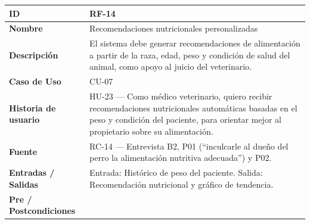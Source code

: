 \documentclass[
]{article}
\newcounter{none} %
\begin{document}
{\def\LTcaptype{none} %
\begin{longtable}[]{|
  >{\raggedright\arraybackslash}p{}|
  >{\raggedright\arraybackslash}p{}|}
\hline
\begin{minipage}[b]{\linewidth}\raggedright
\textbf{ID}
\end{minipage} & \begin{minipage}[b]{\linewidth}\raggedright
RF-14
\end{minipage} \\
\hline
\endhead
\hline
\endlastfoot
\textbf{Nombre} & \begin{minipage}[t]{\linewidth}\raggedright
Recomendaciones nutricionales personalizadas
\end{minipage} \\
\hline
\textbf{Descripción} & \begin{minipage}[t]{\linewidth}\raggedright
El sistema debe generar recomendaciones de alimentación a partir de la raza, edad, peso y condición de salud del animal, como apoyo al juicio del veterinario.
\end{minipage} \\
\hline
\textbf{Caso de Uso} & \begin{minipage}[t]{\linewidth}\raggedright
CU-07
\end{minipage} \\
\hline
\textbf{Historia de usuario} & \begin{minipage}[t]{\linewidth}\raggedright
HU-23 — Como médico veterinario, quiero recibir recomendaciones nutricionales automáticas basadas en el peso y condición del paciente, para orientar mejor al propietario sobre su alimentación.
\end{minipage} \\
\hline
\textbf{Fuente} & \begin{minipage}[t]{\linewidth}\raggedright
RC-14 — Entrevista B2, P01 (“inculcarle al dueño del perro la alimentación nutritiva adecuada”) y P02.
\end{minipage} \\
\hline
\textbf{Entradas / Salidas} & \begin{minipage}[t]{\linewidth}\raggedright
Entrada: Histórico de peso del paciente. Salida: Recomendación nutricional y gráfico de tendencia.
\end{minipage} \\
\hline
\textbf{Pre / Postcondiciones} & \begin{minipage}[t]{\linewidth}\raggedright

\end{minipage}
\end{longtable}}
\end{document}
